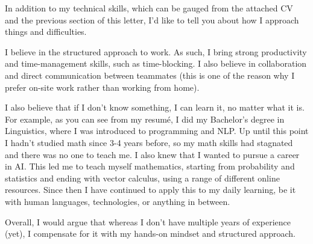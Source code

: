 \documentclass[11pt, a4paper]{awesome-cv}
\begin{document}
\begin{cvletter}
In addition to my technical skills, which can be gauged from the attached CV and the previous section of this letter, I'd like to tell you about how I approach things and difficulties.

I believe in the structured approach to work. As such, I bring strong productivity and time-management skills, such as time-blocking. I also believe in collaboration and direct communication between teammates (this is one of the reason why I prefer on-site work rather than working from home).

I also believe that if I don't know something, I can learn it, no matter what it is. For example, as you can see from my resumé, I did my Bachelor's degree in Linguistics, where I was introduced to programming and NLP. Up until this point I hadn't studied math since 3-4 years before, so my math skills had stagnated and there was no one to teach me. I also knew that I wanted to pursue a career in AI. This led me to teach myself mathematics, starting from probability and statistics and ending with vector calculus, using a range of different online resources. Since then I have continued to apply this to my daily learning, be it with human languages, technologies, or anything in between.

Overall, I would argue that whereas I don't have multiple years of experience (yet), I compensate for it with my hands-on mindset and structured approach.

\end{cvletter}


\makeletterclosing
\end{document}
